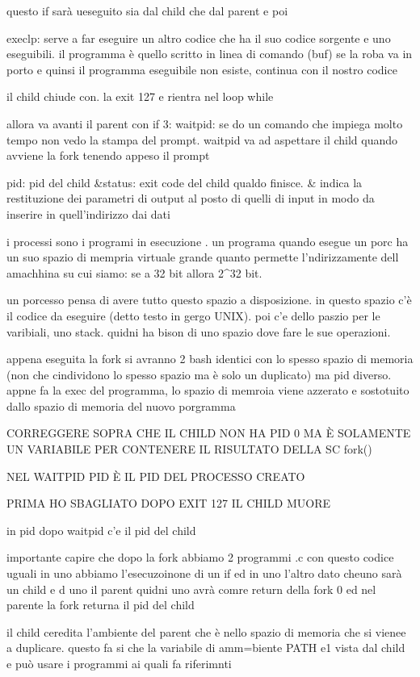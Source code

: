	
	questo if sarà ueseguito sia dal child che dal parent e poi 
	
	
	execlp: serve a far eseguire un altro codice che ha il suo codice sorgente e uno eseguibili. il programma è quello scritto in linea di comando (buf) se la roba va in porto e quinsi il programma eseguibile non esiste, continua con il nostro codice 
	
	il child chiude con. la exit 127 e rientra nel loop while
	

allora va avanti il parent con if 3: waitpid: se do un comando che impiega molto tempo non vedo la stampa del prompt. waitpid va ad aspettare il child quando avviene la fork tenendo appeso il prompt

	pid: pid del child
	&status: exit code del child qualdo finisce. & indica la restituzione dei parametri di output al posto di quelli di input in modo da inserire in quell'indirizzo dai dati
	

i processi sono i programi in esecuzione . un programa quando esegue un porc ha un suo spazio di mempria virtuale grande quanto permette l'ndirizzamente dell amachhina su cui siamo: se a 32 bit allora 2^32 bit.

un porcesso pensa di avere tutto questo spazio a disposizione. in questo spazio c'è il codice da eseguire (detto testo in gergo UNIX). poi c'e dello paszio per le varibiali, uno stack. quidni ha bison di uno spazio dove fare le sue operazioni.

appena eseguita la fork si avranno 2 bash identici con lo spesso spazio di memoria (non che cindividono lo spesso spazio ma è solo un duplicato) ma pid diverso. appne fa la exec del programma, lo spazio di memroia viene azzerato e sostotuito dallo spazio di memoria del nuovo porgramma


CORREGGERE SOPRA CHE IL CHILD NON HA PID 0 MA È SOLAMENTE UN VARIABILE PER CONTENERE IL RISULTATO DELLA SC fork()

NEL WAITPID PID È IL PID DEL PROCESSO CREATO


PRIMA HO SBAGLIATO DOPO EXIT 127 IL CHILD MUORE


in pid dopo waitpid c'e il pid del child 

importante capire che dopo la fork abbiamo 2 programmi .c con questo codice uguali in uno abbiamo l'esecuzoinone di un if ed in uno l'altro dato cheuno sarà un child e d uno il parent quidni uno avrà comre return della fork 0 ed nel parente la fork returna il pid del child

il child ceredita l'ambiente del parent che è nello spazio di memoria che si vienee a duplicare. questo fa si che la variabile di amm=biente PATH e1 vista dal child e può usare i programmi ai quali fa riferimnti

